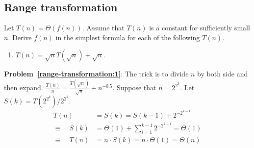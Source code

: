 \subsection{Range transformation}
\begin{Exercise}
Let $T(n) = \Theta(f(n))$. Assume that $T(n)$ is a constant for sufficiently small $n$. Derive $f(n)$ in the simplest formula for each of the following $T(n)$.
\begin{enumerate}
\item $T(n) = \sqrt{n} T(\sqrt{n}) + \sqrt{n}$. \label{range-transformation:1} 
\end{enumerate}
\end{Exercise}
\begin{Answer}

{\bf Problem~\ref{range-transformation:1}}: The trick is to divide $n$ by both side and then expand.
$\frac{T(n)}{n} =  \frac{T(\sqrt{n})}{\sqrt{n}} + n^{-0.5}$.
Suppose that $n = 2^{2^k}$. Let $S(k) = T(2^{2^k})/2^{2^k}$. 
\begin{align*}
T(n) & = S(k) = S(k-1) + 2^{-2^{k-1}} \\
\equiv \quad S(k) &= \Theta(1) + \sum_{i=1}^{k-1} 2^{-2^{k-1}} = \Theta(1) \\
\equiv \quad T(n) &= n \cdot S(k) = n \cdot \Theta(1) = \Theta(n) \\
\end{align*}
\end{Answer}

